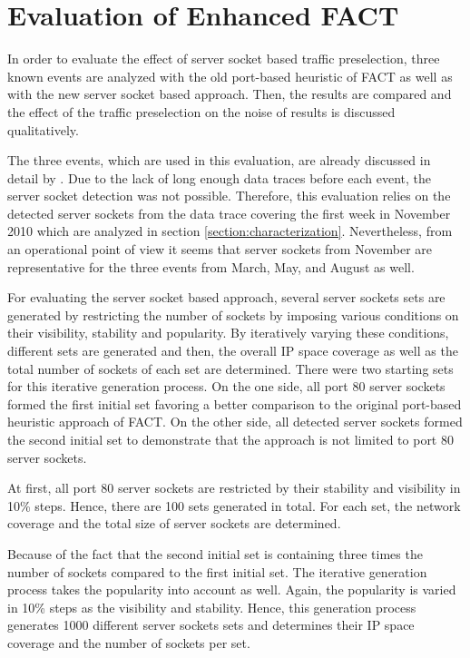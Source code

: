 \newpage
\section{Evaluation of Enhanced FACT\label{section:enhanced_FACT_eval}} 
In order to evaluate the effect of \gls{server socket} based traffic preselection, three known events are analyzed with the old port-based heuristic of \gls{FACT} as well as with the new \gls{server socket} based approach. 
Then, the results are compared and the effect of the traffic preselection on the noise of results is discussed qualitatively.

The three events, which are used in this evaluation, are already discussed in detail by \citet{SchatzmannPAM2011}. 
Due to the lack of long enough data traces before each event, the server socket detection was not possible. 
Therefore, this evaluation relies on the detected \glspl{server socket} from the data trace covering the first week in November 2010 which are analyzed in section \ref{section:characterization}.
Nevertheless, from an operational point of view it seems that \glspl{server socket} from November are representative for the three events from March, May, and August as well.

For evaluating the \gls{server socket} based approach, several \glspl{server socket} sets are generated by restricting the number of sockets by imposing various conditions on their visibility, stability and popularity. 
By iteratively varying these conditions, different sets are generated and then, the overall IP space coverage as well as the total number of sockets of each set are determined. 
There were two starting sets for this iterative generation process. 
On the one side, all port 80 \glspl{server socket} formed the first initial set favoring a better comparison to the original port-based heuristic approach of FACT. 
On the other side, all detected \glspl{server socket} formed the second initial set to demonstrate that the approach is not limited to port 80 \glspl{server socket}. 

At first, all port 80 \glspl{server socket} are restricted by their stability and visibility in 10\% steps. Hence, there are 100 sets generated in total. 
For each set, the network coverage and the total size of \glspl{server socket} are determined. 

Because of the fact that the second initial set is containing three times the number of sockets compared to the first initial set.
The iterative generation process takes the popularity into account as well.
Again, the popularity is varied in 10\% steps as the visibility and stability. 
Hence, this generation process generates 1000 different \glspl{server socket} sets and determines their IP space coverage and the number of sockets per set.

